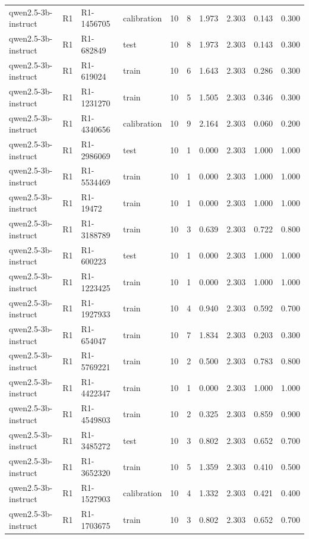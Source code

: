 \begin{table}
\begin{tabular}{llllrrrrrr}
qwen2.5-3b-instruct & R1 & R1-1456705 & calibration & 10 & 8 & 1.973 & 2.303 & 0.143 & 0.300 \\
qwen2.5-3b-instruct & R1 & R1-682849 & test & 10 & 8 & 1.973 & 2.303 & 0.143 & 0.300 \\
qwen2.5-3b-instruct & R1 & R1-619024 & train & 10 & 6 & 1.643 & 2.303 & 0.286 & 0.300 \\
qwen2.5-3b-instruct & R1 & R1-1231270 & train & 10 & 5 & 1.505 & 2.303 & 0.346 & 0.300 \\
qwen2.5-3b-instruct & R1 & R1-4340656 & calibration & 10 & 9 & 2.164 & 2.303 & 0.060 & 0.200 \\
qwen2.5-3b-instruct & R1 & R1-2986069 & test & 10 & 1 & 0.000 & 2.303 & 1.000 & 1.000 \\
qwen2.5-3b-instruct & R1 & R1-5534469 & train & 10 & 1 & 0.000 & 2.303 & 1.000 & 1.000 \\
qwen2.5-3b-instruct & R1 & R1-19472 & train & 10 & 1 & 0.000 & 2.303 & 1.000 & 1.000 \\
qwen2.5-3b-instruct & R1 & R1-3188789 & train & 10 & 3 & 0.639 & 2.303 & 0.722 & 0.800 \\
qwen2.5-3b-instruct & R1 & R1-600223 & test & 10 & 1 & 0.000 & 2.303 & 1.000 & 1.000 \\
qwen2.5-3b-instruct & R1 & R1-1223425 & train & 10 & 1 & 0.000 & 2.303 & 1.000 & 1.000 \\
qwen2.5-3b-instruct & R1 & R1-1927933 & train & 10 & 4 & 0.940 & 2.303 & 0.592 & 0.700 \\
qwen2.5-3b-instruct & R1 & R1-654047 & train & 10 & 7 & 1.834 & 2.303 & 0.203 & 0.300 \\
qwen2.5-3b-instruct & R1 & R1-5769221 & train & 10 & 2 & 0.500 & 2.303 & 0.783 & 0.800 \\
qwen2.5-3b-instruct & R1 & R1-4422347 & train & 10 & 1 & 0.000 & 2.303 & 1.000 & 1.000 \\
qwen2.5-3b-instruct & R1 & R1-4549803 & train & 10 & 2 & 0.325 & 2.303 & 0.859 & 0.900 \\
qwen2.5-3b-instruct & R1 & R1-3485272 & test & 10 & 3 & 0.802 & 2.303 & 0.652 & 0.700 \\
qwen2.5-3b-instruct & R1 & R1-3652320 & train & 10 & 5 & 1.359 & 2.303 & 0.410 & 0.500 \\
qwen2.5-3b-instruct & R1 & R1-1527903 & calibration & 10 & 4 & 1.332 & 2.303 & 0.421 & 0.400 \\
qwen2.5-3b-instruct & R1 & R1-1703675 & train & 10 & 3 & 0.802 & 2.303 & 0.652 & 0.700 \\

\end{tabular}
\end{table}
